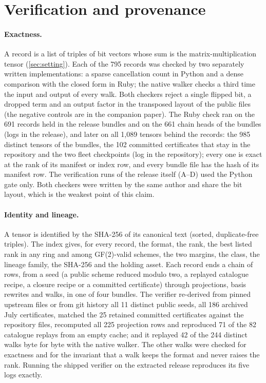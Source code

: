 \section{Verification and provenance}\label{sec:verification}

\paragraph{Exactness.}
A record is a list of triples of bit vectors whose sum is the matrix-multiplication tensor (\cref{sec:setting}). Each of the 795 records was checked by two separately written implementations: a sparse cancellation count in Python and a dense comparison with the closed form in Ruby; the native walker checks a third time the input and output of every walk. Both checkers reject a single flipped bit, a dropped term and an output factor in the transposed layout of the public files (the negative controls are in the companion paper).
The Ruby check ran on the 691 records held in the release bundles and on the 661 chain heads of the bundles (logs in the release), and later on all 1{,}089 tensors behind the records: the 985 distinct tensors of the bundles, the 102 committed certificates that stay in the repository and the two fleet checkpoints (log in the repository); every one is exact at the rank of its manifest or index row, and every bundle file has the hash of its manifest row. The verification runs of the release itself (A--D) used the Python gate only.
Both checkers were written by the same author and share the bit layout, which is the weakest point of this claim.

\paragraph{Identity and lineage.}
A tensor is identified by the SHA-256 of its canonical text (sorted, duplicate-free triples). The index gives, for every record, the format, the rank, the best listed rank in any ring and among GF(2)-valid schemes, the two margins, the class, the lineage family, the SHA-256 and the holding asset. Each record ends a chain of rows, from a seed (a public scheme reduced modulo two, a replayed catalogue recipe, a closure recipe or a committed certificate) through projections, basis rewrites and walks, in one of four bundles.
The verifier re-derived from pinned upstream files or from git history all 11 distinct public seeds, all 186 archived July certificates, matched the 25 retained committed certificates against the repository files, recomputed all 225 projection rows and reproduced 71 of the 82 catalogue replays from an empty cache; and it replayed 42 of the 244 distinct walks byte for byte with the native walker. The other walks were checked for exactness and for the invariant that a walk keeps the format and never raises the rank.
Running the shipped verifier on the extracted release reproduces its five logs exactly.

